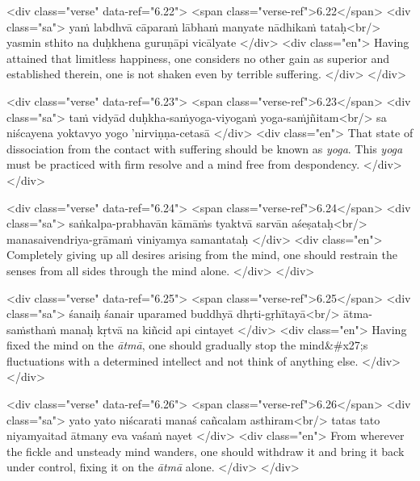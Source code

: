 \begin{html}
<div class="verse" data-ref="6.22">
  <span class="verse-ref">6.22</span>
  <div class="sa">
    yaṁ labdhvā cāparaṁ lābhaṁ manyate nādhikaṁ tataḥ<br/>
    yasmin sthito na duḥkhena guruṇāpi vicālyate
  </div>
  <div class="en">
    Having attained that limitless happiness, one considers no other gain as superior and established therein, one is not shaken even by terrible suffering.
  </div>
</div>
\end{html}



\begin{html}
<div class="verse" data-ref="6.23">
  <span class="verse-ref">6.23</span>
  <div class="sa">
    taṁ vidyād duḥkha-saṁyoga-viyogaṁ yoga-saṁjñitam<br/>
    sa niścayena yoktavyo yogo ’nirviṇṇa-cetasā
  </div>
  <div class="en">
    That state of dissociation from the contact with suffering should be known as \textit{yoga}. This \textit{yoga} must be practiced with firm resolve and a mind free from despondency.
  </div>
</div>
\end{html}



\begin{html}
<div class="verse" data-ref="6.24">
  <span class="verse-ref">6.24</span>
  <div class="sa">
    saṅkalpa-prabhavān kāmāṁs tyaktvā sarvān aśeṣataḥ<br/>
    manasaivendriya-grāmaṁ viniyamya samantataḥ
  </div>
  <div class="en">
    Completely giving up all desires arising from the mind, one should restrain the senses from all sides through the mind alone.
  </div>
</div>
\end{html}



\begin{html}
<div class="verse" data-ref="6.25">
  <span class="verse-ref">6.25</span>
  <div class="sa">
    śanaiḥ śanair uparamed buddhyā dhṛti-gṛhītayā<br/>
    ātma-saṁsthaṁ manaḥ kṛtvā na kiñcid api cintayet
  </div>
  <div class="en">
    Having fixed the mind on the \textit{ātmā}, one should gradually stop the mind&#x27;s fluctuations with a determined intellect and not think of anything else.
  </div>
</div>
\end{html}



\begin{html}
<div class="verse" data-ref="6.26">
  <span class="verse-ref">6.26</span>
  <div class="sa">
    yato yato niścarati manaś cañcalam asthiram<br/>
    tatas tato niyamyaitad ātmany eva vaśaṁ nayet
  </div>
  <div class="en">
    From wherever the fickle and unsteady mind wanders, one should withdraw it and bring it back under control, fixing it on the \textit{ātmā} alone.
  </div>
</div>
\end{html}




